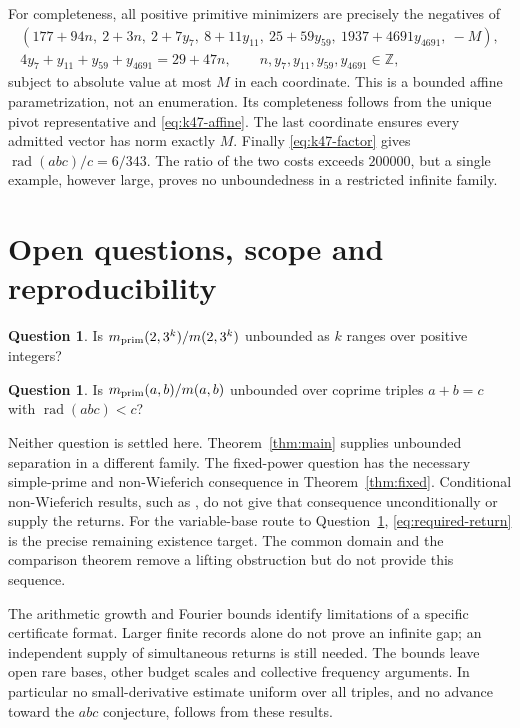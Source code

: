 \documentclass[11pt,a4paper]{article}
\theoremstyle{definition}\newtheorem{question}[theorem]{Question}
\theoremstyle{remark}\newtheorem{remark}[theorem]{Remark}
\newcommand{\Z}{\mathbb Z}\newcommand{\R}{\mathbb R}
\DeclareMathOperator{\rad}{rad}\DeclareMathOperator{\supp}{supp}
\begin{document}
For completeness, all positive primitive minimizers are precisely the
negatives of
\begin{equation}\label{eq:primitive-family}
 \begin{gathered}
 (177+94n,\ 2+3n,\ 2+7y_7,\ 8+11y_{11},\
     25+59y_{59},\ 1937+4691y_{4691},\ -M),\\
 4y_7+y_{11}+y_{59}+y_{4691}=29+47n,\qquad
 n,y_7,y_{11},y_{59},y_{4691}\in\Z,
 \end{gathered}
\end{equation}
subject to absolute value at most \(M\) in each coordinate.
This is a bounded affine parametrization, not an enumeration.
Its completeness follows from the unique pivot representative and
\eqref{eq:k47-affine}. The last coordinate ensures every admitted vector
has norm exactly \(M\).
Finally \eqref{eq:k47-factor} gives \(\rad(abc)/c=6/343\).
The ratio of the two costs exceeds \(200000\), but a single example,
however large, proves no unboundedness in a restricted infinite family.

\section{Open questions, scope and reproducibility}\label{sec:limits}
\begin{question}\label{q:power}
Is $m_{\mathrm{prim}}(2,3^k)/m(2,3^k)$ unbounded as $k$ ranges over positive integers?
\end{question}
\begin{question}\label{q:radical}
Is $m_{\mathrm{prim}}(a,b)/m(a,b)$ unbounded over coprime triples $a+b=c$ with
$\rad(abc)<c$?
\end{question}
Neither question is settled here. Theorem~\ref{thm:main} supplies
unbounded separation in a different family. The fixed-power question
has the necessary simple-prime and non-Wieferich consequence in
Theorem~\ref{thm:fixed}. Conditional non-Wieferich results, such as
\cite[Theorems 1.2--1.4 in the cited arXiv version]{FelliniMurty},
do not give that consequence unconditionally or supply the returns.
For the variable-base route to Question~\ref{q:radical},
\eqref{eq:required-return} is the precise remaining existence target.
The common domain and the comparison theorem remove a lifting
obstruction but do not provide this sequence.

The arithmetic growth and Fourier bounds identify limitations of a
specific certificate format. Larger finite records alone do not prove
an infinite gap; an independent supply of simultaneous returns is
still needed. The bounds leave open rare bases, other budget scales
and collective frequency arguments.
In particular no small-derivative estimate uniform over all triples,
and no advance toward the $abc$ conjecture, follows from these results.
\end{document}
